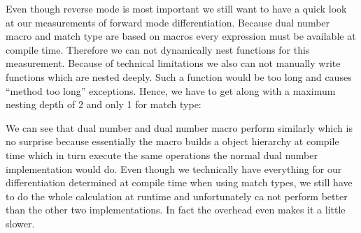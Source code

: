 Even though reverse mode is most important we still want to have a quick look at our measurements of forward mode differentiation. Because dual number macro and match type are based on macros every expression must be available at compile time. Therefore we can not dynamically nest functions for this measurement. Because of technical limitations we also can not manually write functions which are nested deeply. Such a function would be too long and causes ``method too long'' exceptions. Hence, we have to get along with a maximum nesting depth of 2 and only 1 for match type:
\begin{center}
\end{center}
We can see that dual number and dual number macro perform similarly which is no surprise because essentially the macro builds a object hierarchy at compile time which in turn execute the same operations the normal dual number implementation would do. Even though we technically have everything for our differentiation determined at compile time when using match types, we still have to do the whole calculation at runtime and unfortunately ca not perform better than the other two implementations. In fact the overhead even makes it a little slower.


%
%
%
%


